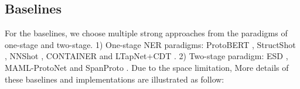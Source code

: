 \documentclass[sigconf,natbib=true,anonymous=False]{acmart}
\begin{document}
\begin{table*}[htbp]
  \centering
  \caption{F1 scores with standard deviations under 1 shot and 5 shot setting on CrossNER.}
    \label{tab:table2}\end{table*}\subsection{Baselines}
For the baselines, we choose multiple strong approaches from the paradigms of one-stage and two-stage. 1) One-stage NER paradigms: ProtoBERT \cite{snell2017prototypical}, StructShot \cite{yang2020simple}, NNShot \cite{yang2020simple}, CONTAINER \cite{das2021container} and LTapNet+CDT \cite{hou2020few}. 2) Two-stage paradigm: ESD \cite{wang2021enhanced}, MAML-ProtoNet \cite{ma2022decomposed} and SpanProto \cite{wang2022spanproto}. Due to the space limitation, More details of these baselines and implementations are illustrated as follow:
\end{document}

